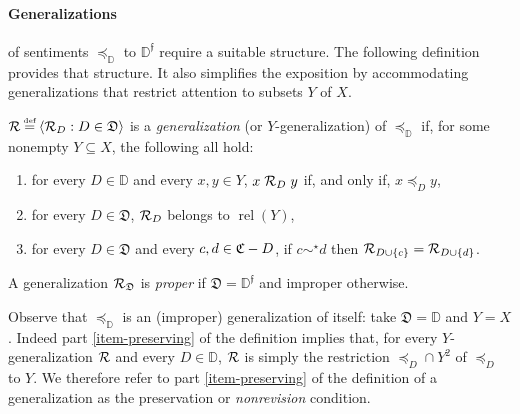 \documentclass[12pt,a4paper,twoside]{article}
\newcommand{\relations}{\operatorname{rel}}
\newcommand{\novel}{\mathfrak f}
\newcommand{\precsimb}{\mathbin{\preceq}}
\newcommand{\preceqb}{\mathbin{\preceq}}
\newcommand{\ext}{\mathrel{\mc R}}
\newcommand{\extb}{\mathbin{\mc R}}
\newcommand{\mbbd}{{\mathds D}}
\newcommand{\mbbdp}{{\mathds D^{\novel}}}
\newcommand{\dpp}{{\mathfrak D}}
\newcommand{\cpp}{{\mathfrak C}}
\begin{document}
\paragraph{Generalizations}\hskip-5pt of sentiments $\precsimb_\mbbd$ to
$\mbbdp$ require a suitable structure. The following definition provides that
structure. It also simplifies the exposition by accommodating generalizations
that restrict attention to subsets $Y$ of $X$.
\begin{definition}\label{def-{generalization}} $\extb \defeq \langle \extb_{D}:
  D\in \dpp \rangle$ is a \emph{{generalization}} (or $Y$-{generalization}) of
  $\preceq_{\mbbd}$ if, for some nonempty $Y \subseteq X$, the following all
  hold$:$

\begin{enumerate}%

\item \label{item-preserving} for every $D \in \mbbd$ and every $x,y\in Y$,
  $x \ext_{D} y$ if, and only if, $x \preceq_{D} y$,

\item\label{item-binary-rel} for every $D\in \dpp$, $\ext_{D}$ belongs
  to $\relations (Y)$,

\item \label{item-dimension} for every $D\in \dpp$ and %
every $c,d \in \cpp\bs D$,  if $c \sim^\star d$ then
  $\extb _ {D \cup \{c\}} = \extb _ {D \cup \{d\}}$.

\end{enumerate}
A {generalization} $\ext_{\dpp}$ is \emph{proper} if $\dpp = \mbbdp$ and improper
  otherwise.
\end{definition}
 Observe that $\preceq_\mbbd$ is an (improper)
{generalization} of itself: take $\dpp = \mbbd$ and $Y = X$.
Indeed part \ref{item-preserving} of the definition implies that, for every
$Y$-{generalization} $\ext$ and every $D\in \mbbd$, $\ext$ is simply the restriction
$\preceqb_{D}\cap Y^{2}$ of $\preceq_{D}$ to $Y$.  We therefore refer to part
\ref{item-preserving} of the definition of a {generalization} as the preservation or
\emph{nonrevision} condition.
\end{document}
